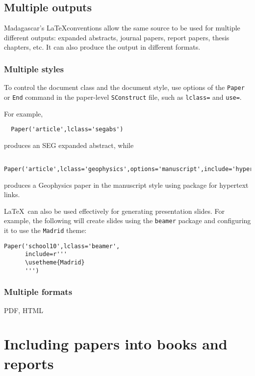 {{\subsection{Multiple outputs}

Madagascar's \LaTeX conventions allow the same source to be used for
multiple different outputs: expanded abstracts, journal papers, report
papers, thesis chapters, etc. It can also produce the output in
different formats.

\subsubsection{Multiple styles}

To control the document class and the document style, use options of the \texttt{Paper} or \texttt{End} command in the paper-level \texttt{SConstruct} file, such as  \texttt{lclass=} and \texttt{use=}.

For example,
\lstset{language=python,showstringspaces=false,frame=single}
\begin{lstlisting}
  Paper('article',lclass='segabs')
\end{lstlisting}
produces an SEG expanded abstract, while
\lstset{language=python,showstringspaces=false,frame=single}
\begin{lstlisting}
  Paper('article',lclass='geophysics',options='manuscript',include='hyperref')
\end{lstlisting}
produces a Geophysics paper in the manuscript style using  package for hypertext links.

\LaTeX\ can also be used effectively for generating presentation slides. For example, the following will create slides using the \texttt{beamer} package and configuring it to use the \texttt{Madrid} theme:
\lstset{language=python,showstringspaces=false,frame=single}
\begin{lstlisting}
Paper('school10',lclass='beamer',
      include=r'''
      \usetheme{Madrid}
      ''')
\end{lstlisting}    

\subsubsection{Multiple formats}

PDF, HTML

\section{Including papers into books and reports}

}}
